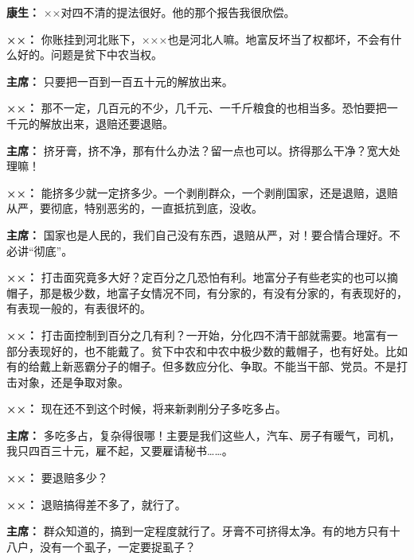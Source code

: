\begin{list}{}
\item[\textbf{康生：}] ××对四不清的提法很好。他的那个报告我很欣偿。

\item[\textbf{××：}] 你账挂到河北账下，×××也是河北人嘛。地富反坏当了权都坏，不会有什么好的。问题是贫下中农当权。

\item[\textbf{主席：}] 只要把一百到一百五十元的解放出来。

\item[\textbf{××：}] 那不一定，几百元的不少，几千元、一千斤粮食的也相当多。恐怕要把一千元的解放出来，退赔还要退赔。

\item[\textbf{主席：}] 挤牙膏，挤不净，那有什么办法？留一点也可以。挤得那么干净？宽大处理嘛！

\item[\textbf{××：}] 能挤多少就一定挤多少。一个剥削群众，一个剥削国家，还是退赔，退赔从严，要彻底，特别恶劣的，一直抵抗到底，没收。

\item[\textbf{主席：}] 国家也是人民的，我们自己没有东西，退赔从严，对！要合情合理好。不必讲“彻底”。

\item[\textbf{××：}] 打击面究竟多大好？定百分之几恐怕有利。地富分子有些老实的也可以摘帽子，那是极少数，地富子女情况不同，有分家的，有没有分家的，有表现好的，有表现一般的，有表很坏的。

\item[\textbf{××：}] 打击面控制到百分之几有利？一开始，分化四不清干部就需要。地富有一部分表现好的，也不能戴了。贫下中农和中农中极少数的戴帽子，也有好处。比如有的给戴上新恶霸分子的帽子。但多数应分化、争取。不能当干部、党员。不是打击对象，还是争取对象。

\item[\textbf{××：}] 现在还不到这个时候，将来新剥削分子多吃多占。

\item[\textbf{主席：}] 多吃多占，复杂得很哪！主要是我们这些人，汽车、房子有暖气，司机，我只四百三十元，雇不起，又要雇请秘书……。

\item[\textbf{××：}] 要退赔多少？

\item[\textbf{××：}] 退赔搞得差不多了，就行了。

\item[\textbf{主席：}] 群众知道的，搞到一定程度就行了。牙膏不可挤得太净。有的地方只有十八户，没有一个虱子，一定要捉虱子？


\end{list}
